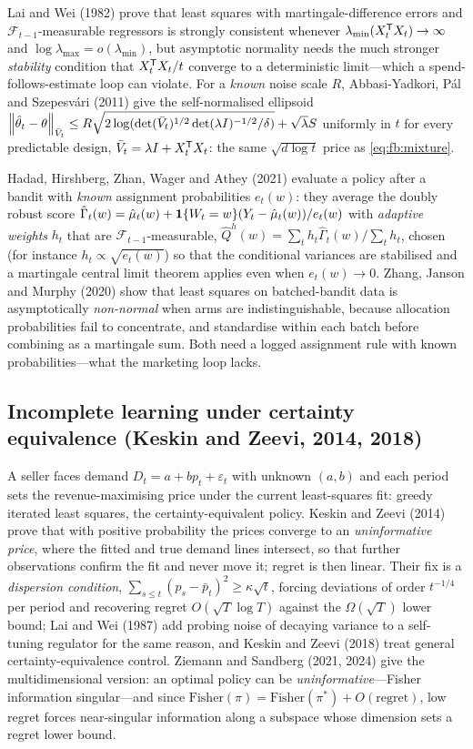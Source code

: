 Lai and Wei (1982) prove that least squares with martingale-difference errors and $\mathcal F_{t-1}$-measurable regressors is strongly consistent whenever $\lambda_{\min}(X_t^{\mathsf{T}} X_t) \to \infty$ and $\log\lambda_{\max} = o(\lambda_{\min})$, but asymptotic normality needs the much stronger \emph{stability} condition that $X_t^{\mathsf{T}} X_t/t$ converge to a deterministic limit---which a spend-follows-estimate loop can violate. For a \emph{known} noise scale $R$, Abbasi-Yadkori, P\'al and Szepesv\'ari (2011) give the self-normalised ellipsoid $\left\|\hat\theta_t - \theta\right\|_{\bar V_t} \le R\sqrt{2\log(\det(\bar V_t)^{1/2}\det(\lambda I)^{-1/2}/\delta)} + \sqrt\lambda S$ uniformly in $t$ for every predictable design, $\bar V_t = \lambda I + X_t^{\mathsf{T}} X_t$: the same $\sqrt{d\log t}$ price as \cref{eq:fb:mixture}.

Hadad, Hirshberg, Zhan, Wager and Athey (2021) evaluate a policy after a bandit with \emph{known} assignment probabilities $e_t(w)$: they average the doubly robust score $\hat\Gamma_t(w) = \hat\mu_t(w) + \mathbf{1}\{W_t = w\}(Y_t - \hat\mu_t(w))/e_t(w)$ with \emph{adaptive weights} $h_t$ that are $\mathcal F_{t-1}$-measurable, $\hat Q^h(w) = \sum_t h_t\hat\Gamma_t(w)/\sum_t h_t$, chosen (for instance $h_t \propto \sqrt{e_t(w)}$) so that the conditional variances are stabilised and a martingale central limit theorem applies even when $e_t(w) \to 0$. Zhang, Janson and Murphy (2020) show that least squares on batched-bandit data is asymptotically \emph{non-normal} when arms are indistinguishable, because allocation probabilities fail to concentrate, and standardise within each batch before combining as a martingale sum. Both need a logged assignment rule with known probabilities---what the marketing loop lacks.

\subsection{Incomplete learning under certainty equivalence (Keskin and Zeevi, 2014, 2018)}

A seller faces demand $D_t = a + bp_t + \varepsilon_t$ with unknown $(a, b)$ and each period sets the revenue-maximising price under the current least-squares fit: greedy iterated least squares, the certainty-equivalent policy. Keskin and Zeevi (2014) prove that with positive probability the prices converge to an \emph{uninformative price}, where the fitted and true demand lines intersect, so that further observations confirm the fit and never move it; regret is then linear. Their fix is a \emph{dispersion condition}, $\sum_{s \le t}(p_s - \bar p_t)^2 \ge \kappa\sqrt t$, forcing deviations of order $t^{-1/4}$ per period and recovering regret $O(\sqrt T\log T)$ against the $\Omega(\sqrt T)$ lower bound; Lai and Wei (1987) add probing noise of decaying variance to a self-tuning regulator for the same reason, and Keskin and Zeevi (2018) treat general certainty-equivalence control. Ziemann and Sandberg (2021, 2024) give the multidimensional version: an optimal policy can be \emph{uninformative}---Fisher information singular---and since $\mathrm{Fisher}(\pi) = \mathrm{Fisher}(\pi^*) + O(\mathrm{regret})$, low regret forces near-singular information along a subspace whose dimension sets a regret lower bound.

